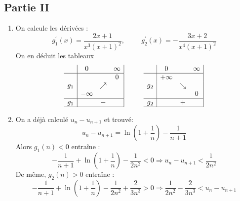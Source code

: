 \subsection*{Partie II}
\begin{enumerate}
 \item On calcule les dérivées :
\begin{displaymath}
 g_1^\prime(x) = \frac{2x+1}{x^3(x+1)^2}, \hspace{1cm}
 g_2^\prime(x) = -\frac{3x+2}{x^4(x+1)^2}  
\end{displaymath}
On en déduit les tableaux
\begin{displaymath}
\begin{array}{l|ccc|}
    &    0     &  & \infty \\ \hline
   &          &  & 0 \\ 
g_1 &          &  \nearrow &  \\
 & -\infty  &  &  \\ \hline
g_1 &          &  - &  \\ \hline
 \end{array}
 \hspace{1cm}
\begin{array}{l|ccc|}
    &    0     &  & \infty \\ \hline 
 & +\infty &  & \\
g_2 &     & \searrow   & \\
 &   &  & 0 \\ \hline
g_2 &          & + &  \\ \hline
 \end{array}
 \end{displaymath}
\item On a déjà calculé $u_n -u_{n+1}$ et trouvé: 
\begin{displaymath}
 u_n -u_{n+1} = \ln \left(1+\frac{1}{n} \right) - \frac{1}{n+1}
\end{displaymath}
Alors $g_1(n)<0$ entraîne :
\begin{displaymath}
  - \frac{1}{n+1} + \ln \left(1+\frac{1}{n} \right) -\frac{1}{2n^2} <0 
\Rightarrow
u_n -u_{n+1} < \frac{1}{2n^2}
\end{displaymath}
De même, $g_2(n)>0$ entraîne :
\begin{displaymath}
  - \frac{1}{n+1} + \ln \left(1+\frac{1}{n} \right) -\frac{1}{2n^2}+\frac{2}{3n^3} >0 
\Rightarrow
\frac{1}{2n^2} -\frac{2}{3n^3} < u_n -u_{n+1} 
\end{displaymath}


\end{enumerate}
